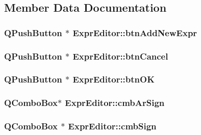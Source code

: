 \subsection{Member Data Documentation}
\hypertarget{class_expr_editor_ad5fabd441b537dd0f7a6d224651e779e}{
\subsubsection[{btnAddNewExpr}]{\setlength{\rightskip}{0pt plus 5cm}QPushButton $\ast$ {\bf ExprEditor::btnAddNewExpr}}}
\label{class_expr_editor_ad5fabd441b537dd0f7a6d224651e779e}
\hypertarget{class_expr_editor_ab5d219b7e1f2e638cff52daca84fc51d}{
\subsubsection[{btnCancel}]{\setlength{\rightskip}{0pt plus 5cm}QPushButton $\ast$ {\bf ExprEditor::btnCancel}}}
\label{class_expr_editor_ab5d219b7e1f2e638cff52daca84fc51d}
\hypertarget{class_expr_editor_a8604bf3ec0dc18c57d659ab5e30cd6a3}{
\subsubsection[{btnOK}]{\setlength{\rightskip}{0pt plus 5cm}QPushButton $\ast$ {\bf ExprEditor::btnOK}}}
\label{class_expr_editor_a8604bf3ec0dc18c57d659ab5e30cd6a3}
\hypertarget{class_expr_editor_a67b34d1b437ea1850eb4d347b143230c}{
\subsubsection[{cmbArSign}]{\setlength{\rightskip}{0pt plus 5cm}QComboBox$\ast$ {\bf ExprEditor::cmbArSign}}}
\label{class_expr_editor_a67b34d1b437ea1850eb4d347b143230c}
\hypertarget{class_expr_editor_a18bdcf551100de6ea18ca691c84a53c8}{
\subsubsection[{cmbSign}]{\setlength{\rightskip}{0pt plus 5cm}QComboBox $\ast$ {\bf ExprEditor::cmbSign}}}
